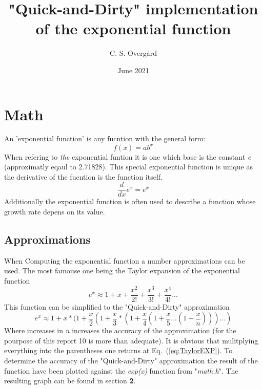 \documentclass[12pt]{article}
\begin{document}
\title{"Quick-and-Dirty" implementation of the exponential function}
\author{C. S. Overgård}
\date{June 2021}
\maketitle
\section{Math}
An 'exponential function' is any fucntion with the general form:
  \begin{equation}
\label{eq:GenEXP}
f(x)=ab^x
	\end{equation}
When refering to \textit{the} exponential funtion it is one which base is the constant \textit{e} (approximatly eqaul to 2.71828). This special exponential function is unique as the derivative of the fucntion is the function itself.
  \begin{equation}
\label{eq:dxEXP}
\frac{d}{dx} e^x = e^x
  \end{equation}
Additionally the exponential function is often used to describe a function whose growth rate depens on its value.
\subsection{Approximations}
When Computing the exponential function a number approximations can be used. The most famouse one being the Taylor expansion of the exponential function
\begin{equation}
\label{eq:TaylorEXP}
e^x \approx 1 + x + \frac{x^2}{2!}+\frac{x^3}{3!}+\frac{x^4}{4!}...
\end{equation}
This function can be simplified to the "Quick-and-Dirty" approximation
\begin{equation}
\label{eq:QnD}
e^x \approx 1 + x * (1+\frac{x}{2}(1+\frac{x}{3}*(1+\frac{x}{4}(1+\frac{x}{5}...(1+\frac{x}{n})))...)
\end{equation}
Where increases in \textit{n} increases the accuracy of the approximation (for the pourpose of this report 10 is more than adequate). It is obvious that mulitplying everything into the parentheses one returns at Eq.~(\ref{eq:TaylorEXP}). To determine the accuracy of the "Quick-and-Dirty" approximation the result of the function have been plotted against the \textit{exp(x)} function from "\textit{math.h}". The resulting graph can be found in section \textbf{2}.
\pagebreak
\end{document}
